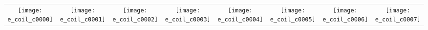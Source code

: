 \begin{tabular}{c @{\hskip 0pt} c @{\hskip 0pt} c @{\hskip 0pt} c @{\hskip 0pt} c @{\hskip 0pt} c @{\hskip 0pt} c @{\hskip 0pt} c }
    \texttt{[image: e\_coil\_c0000]}&
    \texttt{[image: e\_coil\_c0001]}&
    \texttt{[image: e\_coil\_c0002]}&
    \texttt{[image: e\_coil\_c0003]}&
    \texttt{[image: e\_coil\_c0004]}&
    \texttt{[image: e\_coil\_c0005]}&
    \texttt{[image: e\_coil\_c0006]}&
    \texttt{[image: e\_coil\_c0007]}
\end{tabular}